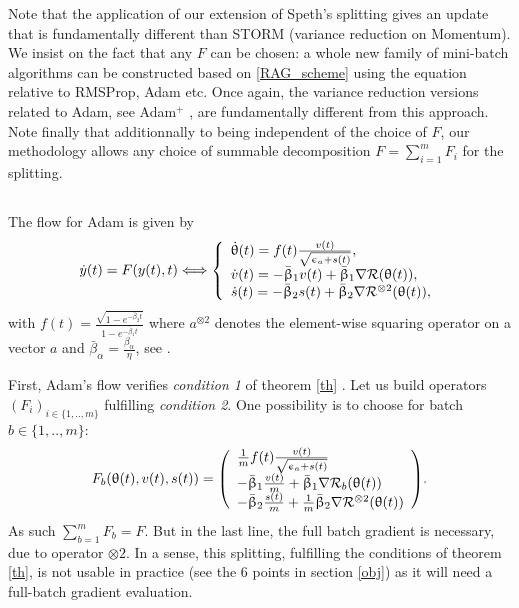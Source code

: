 \documentclass[article,authoryear,jmlmc]{beg_32}             %
\begin{document}
        Note that the application of our extension of Speth's splitting gives an update that is fundamentally different than STORM (variance reduction on Momentum). 
        We insist on the fact that any $F$ can be chosen: a whole new family of mini-batch algorithms can be constructed based on \eqref{RAG_scheme} using the
        equation relative to RMSProp, Adam etc.
        Once again, the variance reduction versions related to Adam, see Adam$^+$ \cite{adam_variance1}, are fundamentally different from this approach.
        Note finally that additionnally to being independent of the choice of $F$, our methodology allows any choice of summable decomposition $F=\sum_{i=1}^m F_i$ for the
        splitting. 

\subsection{}
\label{adam}
The flow for Adam is given by \cite{bianchi,Bilel,Bilel_thesis}
\begin{eqnarray}
  \label{Flow_adam}
  \dot{y}(t) = F(y(t),t) \Longleftrightarrow  \left\{\begin{array}{l}
    \dot{\theta}(t)= f(t) \frac{v(t)}{\sqrt{\epsilon_a+s(t)}},\\
    \dot{v}(t)= -\bar{\beta}_1 v(t)+\bar{\beta}_1\nR(\theta(t)),\\
    \dot{s}(t)= -\bar{\beta}_2 s(t)+\bar{\beta}_2\nR^{\otimes 2}(\theta(t)),\\
  \end{array}\right.
\end{eqnarray}
with $f(t)= \frac{\sqrt{1-e^{-\bar{\beta}_2 t}}}{1-e^{-\bar{\beta}_1 t}}$
    where $a^{\otimes 2}$  denotes the element-wise squaring operator on a vector $a$ and $\bar{\beta}_\alpha = \frac{\beta_\alpha}{\eta}$, see \cite{Bilel}.

First, Adam's flow verifies {\em condition 1} of theorem \ref{th} \cite{bianchi,Bilel}.
Let us build operators $(F_i)_{i\in\{1,..,m\}}$ fulfilling {\em condition 2}.
One possibility is to choose for batch $b\in\{1,..,m\}$:
\begin{eqnarray}
\label{F_j_adam_1}
F_b(\theta(t),v(t),s(t))=\left(\begin{array}{l}
  \frac{1}{m}f(t) \frac{v(t)}{\sqrt{\epsilon_a+s(t)}}\\
     -\bar{\beta}_1 \frac{v(t)}{m}+\bar{\beta}_1\nR_b(\theta(t))\\
     -\bar{\beta}_2 \frac{s(t)}{m}+\frac{1}{m}\bar{\beta}_2\nR^{\otimes 2}(\theta(t))\\
  \end{array}\right).
\end{eqnarray}
As such $\sum_{b=1}^m F_b=F$. But in the last line, the full batch gradient is necessary, due to operator $\otimes 2$. 
In a sense, this splitting, fulfilling the conditions of theorem \ref{th}, is not usable in practice (see the 6 points in section \ref{obj}) as it will need a full-batch gradient evaluation. 
\end{document}
